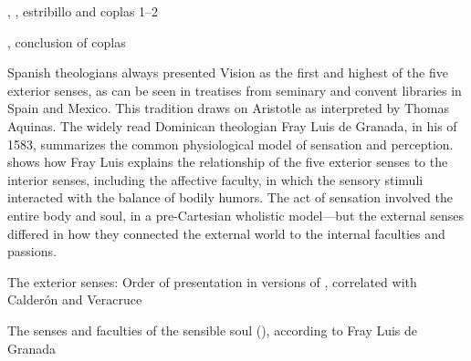 \begin{expoem}
\caption{, , estribillo and coplas 1--2}
\label{expoem:Si_los_sentidos-Sanchez-estribillo}
\end{expoem}
\begin{expoem}
\caption{, conclusion of coplas}
\label{expoem:Si_los_sentidos-Sanchez-coplas}
\end{expoem}


Spanish theologians always presented Vision as the first and highest of the five exterior senses, as can be seen in treatises from seminary and convent libraries in Spain and Mexico.
This tradition draws on Aristotle as interpreted by Thomas Aquinas.
The widely read Dominican theologian Fray Luis de Granada, in his  of 1583, summarizes the common physiological model of sensation and perception.
 shows how Fray Luis explains the relationship of the five exterior senses to the interior senses, including the affective faculty, in which the sensory stimuli interacted with the balance of bodily humors.
The act of sensation involved the entire body and soul, in a pre-Cartesian wholistic model---but the external senses differed in how they connected the external world to the internal faculties and passions.

\begin{table}
\caption{The exterior senses: Order of presentation in versions of , correlated with Calderón and Veracruce}
\label{table:senses-order}
\end{table}


\begin{table}
\caption{The senses and faculties of the sensible soul (), according to Fray Luis de Granada}
\label{table:senses-fray-luis}
\end{table}

